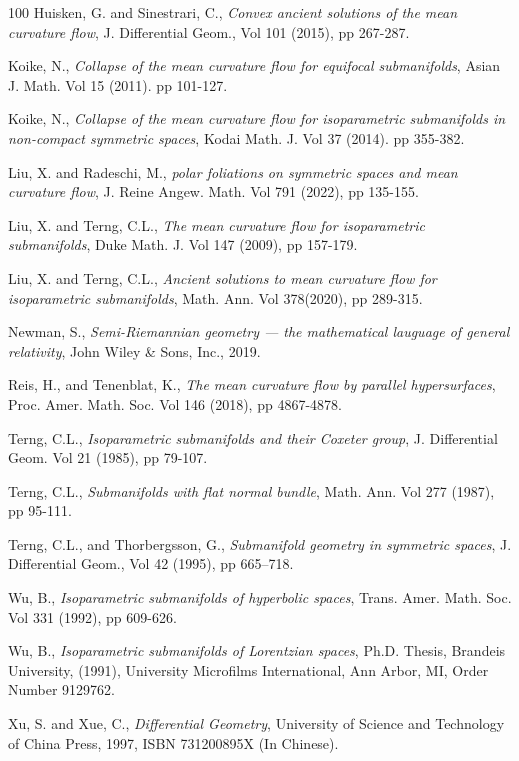 \documentclass[12pt]{article}
\begin{document}
\begin{thebibliography}{100}
 Huisken, G. and  Sinestrari, C., {\it Convex ancient solutions of the mean curvature flow},
    J. Differential Geom., Vol 101 (2015), pp 267-287.


 Koike, N., {\it Collapse of the mean curvature flow for equifocal submanifolds}, Asian J. Math. Vol 15 (2011). pp 101-127.

 Koike, N., {\it Collapse of the mean curvature flow for isoparametric submanifolds in non-compact symmetric  spaces}, Kodai Math. J. Vol 37 (2014). pp 355-382.


 Liu, X. and Radeschi, M., {\it polar foliations on symmetric spaces and mean curvature flow}, J. Reine Angew. Math. Vol 791 (2022), pp 135-155.


 Liu, X. and Terng, C.L.,  {\it The mean curvature flow for isoparametric submanifolds}, Duke Math. J. Vol 147 (2009), pp 157-179.
        	
 Liu, X. and Terng, C.L.,  {\it Ancient solutions to mean curvature flow for isoparametric submanifolds}, Math. Ann. Vol 378(2020), pp 289-315.


 Newman, S., {\it Semi-Riemannian geometry --- the mathematical lauguage of general relativity}, John Wiley \& Sons, Inc., 2019.


  Reis, H., and  Tenenblat, K., {\it The mean   curvature flow by parallel hypersurfaces},  Proc. Amer. Math. Soc. Vol 146 (2018), pp 4867-4878.



 Terng, C.L., {\it Isoparametric submanifolds and their Coxeter group}, J. Differential Geom. Vol 21 (1985), pp 79-107.

 Terng, C.L., {\it Submanifolds with flat normal bundle}, Math. Ann. Vol 277 (1987), pp 95-111.

Terng, C.L., and Thorbergsson, G., {\it Submanifold geometry in symmetric spaces}, J. Differential Geom., Vol 42 (1995), pp 665--718.

 Wu, B., {\it Isoparametric submanifolds of hyperbolic spaces}, Trans. Amer. Math. Soc.  Vol 331 (1992), pp 609-626.
	
 Wu, B., {\it Isoparametric submanifolds of Lorentzian spaces},
	Ph.D. Thesis, Brandeis University, (1991), University Microfilms International, Ann Arbor, MI, Order Number 9129762.
	
 Xu, S. and Xue,  C., {\it Differential Geometry}, University of Science and Technology of China Press, 1997, ISBN 731200895X (In Chinese).

\end{thebibliography}
\end{document}
